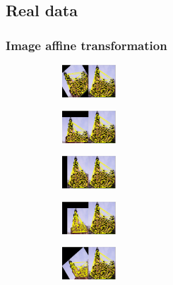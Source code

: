 \documentclass[hyperref={pdfpagelabels=false}]{beamer}
\begin{document}
\subsection{Real data}
\begin{frame}[allowframebreaks]
\frametitle{Image affine transformation}

\begin{figure}[h] 
		\begin{subfigure}[b]{0.32\textwidth}
			\centering
			\includegraphics[width=2cm]{"fig/evaluation/ImageTrafo/Img_pair1"} 
		\end{subfigure}
		\begin{subfigure}[b]{0.32\textwidth}
			\centering
			\includegraphics[width=2cm]{"fig/evaluation/ImageTrafo/Img_pair2"} 
		\end{subfigure} 
		\begin{subfigure}[b]{0.32\textwidth}
			\centering
			\includegraphics[width=2cm]{"fig/evaluation/ImageTrafo/Img_pair3"}
		\end{subfigure} 	
		\begin{subfigure}[b]{0.45\textwidth}
			\centering
			\includegraphics[width=2cm]{"fig/evaluation/ImageTrafo/Img_pair4"} 
		\end{subfigure} 
		\begin{subfigure}[b]{0.45\textwidth}
			\centering
			\includegraphics[width=2cm]{"fig/evaluation/ImageTrafo/Img_pair5"}
		\end{subfigure} 	
\end{figure}


\end{frame}
\end{document}
